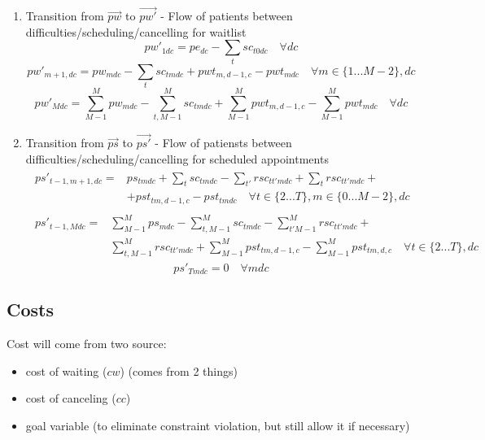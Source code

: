 \documentclass{article}
\begin{document}
\begin{enumerate}
	\item Transition from $\vec{pw}$ to $\vec{pw'}$ - Flow of patients between difficulties/scheduling/cancelling for waitlist
		\begin{equation}  
			pw'_{1dc} = pe_{dc} - \sum_{t} sc_{t0dc} \quad \forall dc 
		\end{equation} 
		\begin{equation}  
			pw'_{m+1, dc} = pw_{mdc} - \sum_{t} sc_{tmdc} + pwt_{m,d-1,c} - pwt_{mdc} \quad \forall m \in \{1...M-2 \}, dc 
		\end{equation} 
		\begin{equation}  
			pw'_{Mdc} = \sum_{M-1}^M pw_{mdc} - \sum_{t,M-1}^{M} sc_{tmdc} + \sum_{M-1}^{M} pwt_{m,d-1,c} - 
			\sum_{M-1}^{M} pwt_{mdc}\quad \forall dc 
		\end{equation} 

	\item Transition from $\vec{ps}$ to $\vec{ps'}$ - Flow of patiensts between difficulties/scheduling/cancelling for scheduled appointments
		\begin{align}  \begin{split}
			ps'_{t-1,m+1,dc} = & ps_{tmdc} +  \sum_{t} sc_{tmdc} - \sum_{t'} rsc_{tt'mdc} + \sum_{t} rsc_{tt'mdc} +\\ 
										& + pst_{tm,d-1,c} - pst_{tmdc} \quad \forall t \in \{2 ... T\},  m \in \{0... M-2 \}, dc 
		\end{split} \end{align} 
		\begin{align} \begin{split}  
			ps'_{t-1,Mdc} = & \sum_{M-1}^M ps_{mdc}  - \sum_{t,M-1}^{M} sc_{tmdc}  - \sum_{t'M-1}^M rsc_{tt'mdc} + \\
									& \sum_{t,M-1}^M rsc_{tt'mdc} + \sum_{M-1}^{M} pst_{tm,d-1,c} - \sum_{M-1}^{M} pst_{tm,d,c}
									\quad \forall t \in \{2...T \}, dc 
		\end{split} \end{align}		
		\begin{equation}  
			ps'_{Tmdc} = 0 \quad \forall mdc 
		\end{equation} 
\end{enumerate}
    
\subsection{Costs}
Cost will come from two source:  
\begin{itemize} 
	\item cost of waiting ($cw$) (comes from 2 things)
	\item cost of canceling ($cc$)
	\item goal variable (to eliminate constraint violation, but still allow it if necessary)
\end{itemize}
\end{document}
